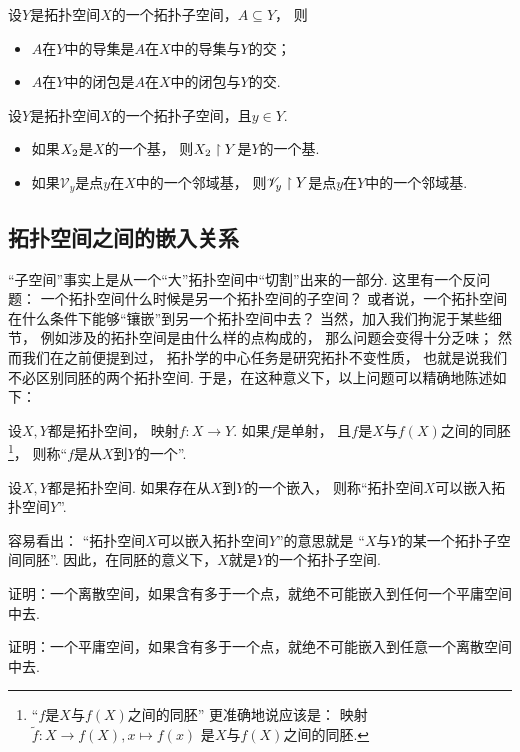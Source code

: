\begin{theorem}
设\(Y\)是拓扑空间\(X\)的一个拓扑子空间，\(A \subseteq Y\)，
则\begin{itemize}
	\item \(A\)在\(Y\)中的导集是\(A\)在\(X\)中的导集与\(Y\)的交；
	\item \(A\)在\(Y\)中的闭包是\(A\)在\(X\)中的闭包与\(Y\)的交.
\end{itemize}
\end{theorem}

\begin{theorem}
\def\Vy{\mathscr{V}_y}
设\(Y\)是拓扑空间\(X\)的一个拓扑子空间，且\(y \in Y\).
\begin{itemize}
	\item 如果\(X_2\)是\(X\)的一个基，
	则\(X_2 \upharpoonright Y\)是\(Y\)的一个基.
	\item 如果\(\Vy\)是点\(y\)在\(X\)中的一个邻域基，
	则\(\Vy \TopoRestrict Y\)是点\(y\)在\(Y\)中的一个邻域基.
\end{itemize}
\end{theorem}

\subsection{拓扑空间之间的嵌入关系}
“子空间”事实上是从一个“大”拓扑空间中“切割”出来的一部分.
这里有一个反问题：
一个拓扑空间什么时候是另一个拓扑空间的子空间？
或者说，一个拓扑空间在什么条件下能够“镶嵌”到另一个拓扑空间中去？
当然，加入我们拘泥于某些细节，
例如涉及的拓扑空间是由什么样的点构成的，
那么问题会变得十分乏味；
然而我们在之前便提到过，
拓扑学的中心任务是研究拓扑不变性质，
也就是说我们不必区别同胚的两个拓扑空间.
于是，在这种意义下，以上问题可以精确地陈述如下：
\begin{definition}
设\(X,Y\)都是拓扑空间，
映射\(f\colon X \to Y\).
如果\(f\)是单射，
且\(f\)是\(X\)与\(f(X)\)之间的同胚\footnote{
	“\(f\)是\(X\)与\(f(X)\)之间的同胚”
	更准确地说应该是：
	映射\(\tilde{f}\colon X \to f(X), x \mapsto f(x)\)
	是\(X\)与\(f(X)\)之间的同胚.
}，
则称“\(f\)是从\(X\)到\(Y\)的一个”.
\end{definition}
\begin{definition}
设\(X,Y\)都是拓扑空间.
如果存在从\(X\)到\(Y\)的一个嵌入，
则称“拓扑空间\(X\)可以嵌入拓扑空间\(Y\)”.
\end{definition}
\begin{remark}
容易看出：
“拓扑空间\(X\)可以嵌入拓扑空间\(Y\)”的意思就是
“\(X\)与\(Y\)的某一个拓扑子空间同胚”.
因此，在同胚的意义下，\(X\)就是\(Y\)的一个拓扑子空间.
\end{remark}

\begin{example}
证明：一个离散空间，如果含有多于一个点，就绝不可能嵌入到任何一个平庸空间中去.
\end{example}

\begin{example}
证明：一个平庸空间，如果含有多于一个点，就绝不可能嵌入到任意一个离散空间中去.
\end{example}
